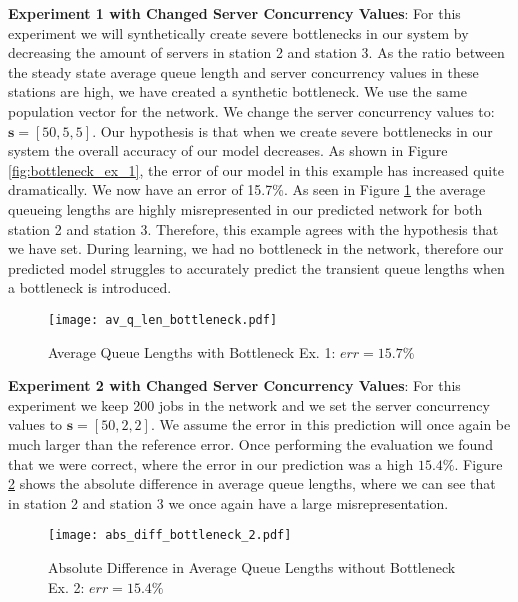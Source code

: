 \documentclass[a4paper,11pt,titlepage]{article}
\begin{document}
\textbf{Experiment 1 with Changed Server Concurrency Values}: For this experiment we will synthetically create severe bottlenecks in our system by decreasing the amount of servers in station 2 and station 3. As the ratio between the steady state average queue length and server concurrency values in these stations are high, we have created a synthetic bottleneck. We use the same population vector for the network. We change the server concurrency values to: $\mathbf{s} = [50,5,5]$. Our hypothesis is that when we create severe bottlenecks in our system the overall accuracy of our model decreases. As shown in Figure \ref{fig:bottleneck_ex_1}, the error of our model in this example has increased quite dramatically. We now have an error of 15.7\%. As seen in Figure \ref{fig:bottleneck_ex_1_q_len} the average queueing lengths are highly misrepresented in our predicted network for both station 2 and station 3. Therefore, this example agrees with the hypothesis that we have set. During learning, we had no bottleneck in the network, therefore our predicted model struggles to accurately predict the transient queue lengths when a bottleneck is introduced.  \\

\begin{figure}[h!]
\begin{center}
\texttt{[image: av\_q\_len\_bottleneck.pdf]}
\caption{Average Queue Lengths with Bottleneck Ex. 1: $err = 15.7\%$}
\label{fig:bottleneck_ex_1_q_len}
\end{center}
\end{figure}

\textbf{Experiment 2 with Changed Server Concurrency Values}: For this experiment we keep 200 jobs in the network and we set the server concurrency values to $\mathbf{s} = [50,2,2]$. We assume the error in this prediction will once again be much larger than the reference error. Once performing the evaluation we found that we were correct, where the error in our prediction was a high $15.4\%$. Figure \ref{fig:bottleneck_ex_2} shows the absolute difference in average queue lengths, where we can see that in station 2 and station 3 we once again have a large misrepresentation. \\

\begin{figure}[h!]
\begin{center}
\texttt{[image: abs\_diff\_bottleneck\_2.pdf]}
\caption{Absolute Difference in Average Queue Lengths without Bottleneck Ex. 2: $err = 15.4\%$}
\label{fig:bottleneck_ex_2}
\end{center}
\end{figure}
\end{document}
